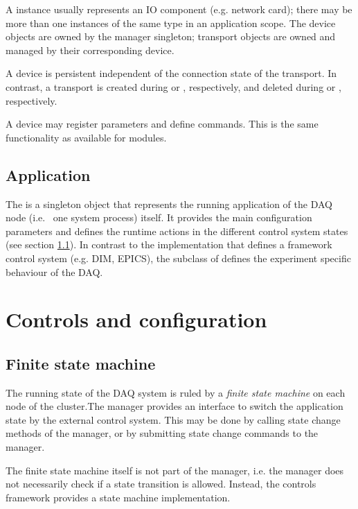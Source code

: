 A  instance usually represents an IO component (e.g. network card); 
there may be more than one  instances of the same 
type in an application scope. 
The device objects are owned by the manager 
singleton; transport objects are owned and managed by their corresponding device.  

A device is persistent independent of the connection state 
of the transport. In contrast, a transport is created 
during  or , respectively,
and deleted during  or , respectively. 

A device may register parameters and define 
commands. This is the same functionality as available for modules.   
   
   


\subsection{Application}
The  
is a singleton object that represents the running application of the DAQ node 
(i.e.~ one system process) itself. It provides the main configuration parameters
and defines the runtime actions in the different control system states (see section \ref{prog_fsm}).
In contrast to the  implementation that defines a framework control system (e.g. DIM, EPICS), the subclass of  defines the experiment specific behaviour of the DAQ.


               
\section{Controls and configuration}
\subsection{Finite state machine}
\label{prog_fsm}

The running state of the DAQ system is ruled by a {\sl finite state machine} on 
each node of the cluster.The manager provides an interface to switch the application 
	 state by the external control system. This may be done by calling 
	 state change methods of the manager, or by submitting state change commands 
      to the manager.

The finite state machine itself is not part of the manager, 
      i.e. the manager does not necessarily check if a state transition 
      is allowed. Instead, the controls framework provides a 
      state machine implementation.

